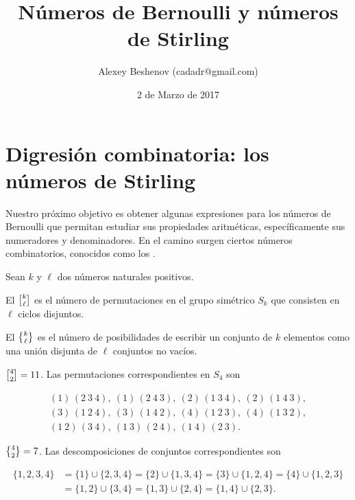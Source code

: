 \documentclass{article}
\author{Alexey Beshenov (cadadr@gmail.com)}
\title{Números de Bernoulli y números de Stirling}
\date{2 de Marzo de 2017}
\begin{document}
{\normalfont\sffamily\bfseries \maketitle}

\section*{Digresión combinatoria: los números de Stirling}

Nuestro próximo objetivo es obtener algunas expresiones para los números de Bernoulli que permitan estudiar sus propiedades aritméticas, específicamente sus numeradores y denominadores. En el camino surgen ciertos números combinatorios, conocidos como los .

\begin{definicion*}
Sean $k$ y $\ell$ dos números naturales positivos.

El  $\stirling{k}{\ell}$ es el número de permutaciones en el grupo simétrico $S_k$ que consisten en $\ell$ ciclos disjuntos.

El  $\Stirling{k}{\ell}$ es el número de posibilidades de escribir un conjunto de $k$ elementos como una unión disjunta de $\ell$ conjuntos no vacíos.
\end{definicion*}

\begin{ejemplo*}
$\stirling{4}{2} = 11$. Las permutaciones correspondientes en $S_4$ son

\begin{gather*}
(1)\,(2~3~4), ~ (1)\,(2~4~3), ~ (2)\,(1~3~4), ~ (2)\,(1~4~3),\\
(3)\,(1~2~4), ~ (3)\,(1~4~2), ~ (4)\,(1~2~3), ~ (4)\,(1~3~2),\\
(1~2)\,(3~4), ~ (1~3)\,(2~4), ~ (1~4)\,(2~3).
\end{gather*}
\end{ejemplo*}

\begin{ejemplo*}
$\Stirling{4}{2} = 7$. Las descomposiciones de conjuntos correspondientes son

\begin{align*}
\{ 1,2,3,4 \} & = \{ 1 \} \cup \{ 2,3,4 \} = \{ 2 \} \cup \{ 1,3,4 \} = \{ 3 \} \cup \{ 1,2,4 \} = \{ 4 \} \cup \{ 1,2,3 \} \\
 & = \{ 1,2 \} \cup \{ 3,4 \} = \{ 1,3 \} \cup \{ 2,4 \} = \{ 1,4 \} \cup \{ 2,3 \}.
\end{align*}
\end{ejemplo*}
\end{document}
